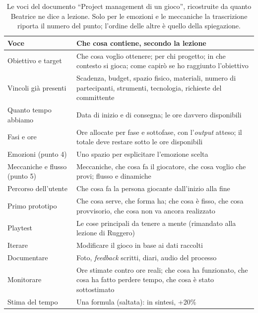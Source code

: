 \begin{table}[htbp]
\centering
\small
\begin{tabular}{@{}p{3.6cm}p{9.6cm}@{}}
\toprule
\textbf{Voce} & \textbf{Che cosa contiene, secondo la lezione} \\
\midrule
Obiettivo e target & Che cosa voglio ottenere; per chi progetto; in che contesto si
  gioca; come capirò se ho raggiunto l'obiettivo \\
Vincoli già presenti & Scadenza, budget, spazio fisico, materiali, numero di
  partecipanti, strumenti, tecnologia, richieste del committente \\
Quanto tempo abbiamo & Data di inizio e di consegna; le ore davvero disponibili \\
Fasi e ore & Ore allocate per fase e sottofase, con l'\emph{output} atteso; il
  totale deve restare sotto le ore disponibili \\
Emozioni (punto 4) & Uno spazio per esplicitare l'emozione scelta \\
Meccaniche e flusso (punto 5) & Meccaniche, che cosa fa il giocatore, che cosa
  voglio che provi; flusso e dinamiche \\
Percorso dell'utente & Che cosa fa la persona giocante dall'inizio alla fine \\
Primo prototipo & Che cosa serve, che forma ha; che cosa è fisso, che cosa
  provvisorio, che cosa non va ancora realizzato \\
Playtest & Le cose principali da tenere a mente (rimandato alla lezione di
  Ruggero) \\
Iterare & Modificare il gioco in base ai dati raccolti \\
Documentare & Foto, \emph{feedback} scritti, diari, audio del processo \\
Monitorare & Ore stimate contro ore reali; che cosa ha funzionato, che cosa ha
  fatto perdere tempo, che cosa è stato sottostimato \\
Stima del tempo & Una formula (saltata): in sintesi, +20\% \\
\bottomrule
\end{tabular}
\caption{Le voci del documento ``Project management di un gioco'', ricostruite da
quanto Beatrice ne dice a lezione. Solo per le emozioni e le meccaniche la
trascrizione riporta il numero del punto; l'ordine delle altre è quello della
spiegazione.}
\label{a9:tab:documento}
\end{table}

